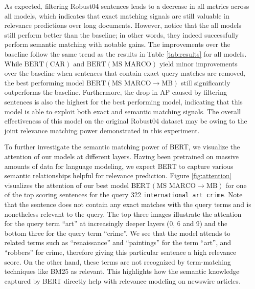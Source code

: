 As expected, filtering Robust04 sentences leads to a decrease in all metrics across all models, which indicates that exact matching signals are still valuable in relevance predictions over long documents.
However, notice that the all models still perform better than the baseline; in other words, they indeed successfully perform semantic matching with notable gains.
The improvements over the baseline follow the same trend as the results in Table \ref{tab:results} for all models.
While $ \textrm{BERT} (\textrm{CAR}) $ and $ \textrm{BERT} (\textrm{MS MARCO}) $ yield minor improvements over the baseline when sentences that contain exact query matches are removed, the best performing model $ \textrm{BERT} (\textrm{MS MARCO}\rightarrow\textrm{MB}) $ still significantly outperforms the baseline.
Furthermore, the drop in AP caused by filtering sentences is also the highest for the best performing model, indicating that this model is able to exploit both exact and semantic matching signals.
The overall effectiveness of this model on the original Robust04 dataset may be owing to the joint relevance matching power demonstrated in this experiment.

To further investigate the semantic matching power of BERT, we visualize the attention of our models at different layers.
Having been pretrained on massive amounts of data for language modeling, we expect BERT to capture various semantic relationships helpful for relevance prediction.
Figure \ref{fig:attention} visualizes the attention of our best model $ \textrm{BERT} (\textrm{MS MARCO}\rightarrow\textrm{MB}) $ for one of the top scoring sentences for the query 322 \texttt{international art crime}.
Note that the sentence does not contain any exact matches with the query terms and is nonetheless relevant to the query.
The top three images illustrate the attention for the query term ``art'' at increasingly deeper layers (0, 6 and 9) and the bottom three for the query term ``crime''.
We see that the model attends to related terms such as ``renaissance'' and ``paintings'' for the term ``art'', and ``robbers'' for crime, therefore giving this particular sentence a high relevance score.
On the other hand, these terms are not recognized by term-matching techniques like BM25 as relevant.
This highlights how the semantic knowledge captured by BERT directly help with relevance modeling on newswire articles.


